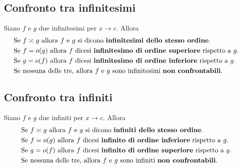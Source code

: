 \documentclass{book}
\begin{document}
\noindent\begin{minipage}{\textwidth}
  \begin{proposition}
    \subsection{Confronto tra infinitesimi}
    Siano \(f\) e \(g\) due infinitesimi per \(x \to c\). Allora
    \begin{align*}
       & \text{Se } f \asymp g \text{ allora } f \text{ e } g \text{ si dicono \textbf{infinitesimi dello stesso ordine}.} \\
       & \text{Se } f = o(g) \text{ allora } f \text{ dicesi \textbf{infinitesimo di ordine superiore} rispetto a } g.     \\
       & \text{Se } g = o(f) \text{ allora } f \text{ dicesi \textbf{infinitesimo di ordine inferiore} rispetto a } g.     \\
       & \text{Se nessuna delle tre, allora } f \text{ e } g \text{ sono infinitesimi \textbf{non confrontabili}.}
    \end{align*}
  \end{proposition}
  \begin{proposition}
    \subsection{Confronto tra infiniti}
    Siano \(f\) e \(g\) due infiniti per \(x \to c\). Allora
    \begin{align*}
       & \text{Se } f \asymp g \text{ allora } f \text{ e } g \text{ si dicono \textbf{infiniti dello stesso ordine}.} \\
       & \text{Se } f = o(g) \text{ allora } f \text{ dicesi \textbf{infinito di ordine inferiore} rispetto a } g.     \\
       & \text{Se } g = o(f) \text{ allora } f \text{ dicesi \textbf{infinito di ordine superiore} rispetto a } g.     \\
       & \text{Se nessuna delle tre, allora } f \text{ e } g \text{ sono infiniti \textbf{non confrontabili}.}
    \end{align*}
  \end{proposition}
  \begin{theorem}

\end{theorem}
\end{minipage}
\end{document}
